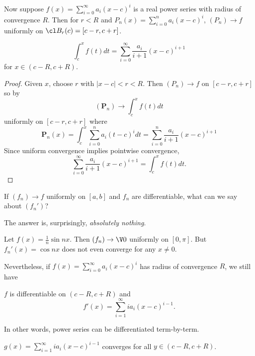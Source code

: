 \documentclass[a4paper]{article}
\theoremstyle{definition}
\begin{document}
Now suppose \(f(x) = \sum_{i=0}^{\infty}a_i(x-c)^i \) is a real power series with radius of convergence \(R\). Then for \(r< R\) and \(P_n(x) = \sum_{i=0}^{n}a_i(x-c)^i \), \((P_n)\to f\) uniformly on \(\cl B_r(c) = [c-r,c+r]\).

\begin{corollary}
  \[
    \int_{c}^{x} f(t) dt = \sum_{i=0}^{\infty}\frac{a_i}{i+1}(x-c)^{i+1}
  \]
  for \(x\in (c-R,c+R)\).
\end{corollary}

\begin{proof}
  Given \(x\), choose \(r\) with \(|x-c| < r < R\). Then \((P_n)\to f\) on \([c-r, c+r]\) so by 
  \[
    (\mathbf{P}_n) \to \int_{c}^{x} f(t) dt
  \]
  uniformly on \([c-r, c+r]\) where
  \[
    \mathbf{P}_n(x) = \int_{c}^{x} \sum_{i=0}^{n}a_i(t-c)^i dt = \sum_{i=0}^{n} \frac{a_i}{i+1} (x-c)^{i+1}
  \]
  Since uniform convergence implies pointwise convergence,
  \[
    \sum_{i=0}^{\infty}\frac{a_i}{i+1}(x-c)^{i+1} = \int_{c}^{x} f(t) dt.
  \]
\end{proof}

\begin{question}
  If \((f_n)\to f\) uniformly on \([a,b]\) and \(f_n\) are differentiable, what can we say about \((f_n')\)?
\end{question}

The answer is, surprisingly, \emph{absolutely nothing}.

\begin{eg}
  Let \(f(x) = \frac{1}{n}\sin nx\). Then \((f_n)\to \V 0\) uniformly on \([0,\pi]\). But \(f_n'(x) = \cos nx\) does not even converge for any \(x\neq 0\).
\end{eg}

Nevertheless, if \(f(x) = \sum_{i=0}^{\infty}a_i(x-c)^i \) has radius of convergence \(R\), we still have

\begin{proposition}
  \(f\) is differentiable on \((c-R, c+R)\) and
  \[
    f'(x) = \sum_{i=1}^{\infty}i a_i(x-c)^{i-1}. 
  \]
\end{proposition}

In other words, power series can be differentiated term-by-term.

\begin{lemma}
  \(g(x) = \sum_{i=1}^{\infty}i a_i(x-c)^{i-1} \) converges for all \(y\in(c-R,c+R)\).
\end{lemma}
\end{document}
